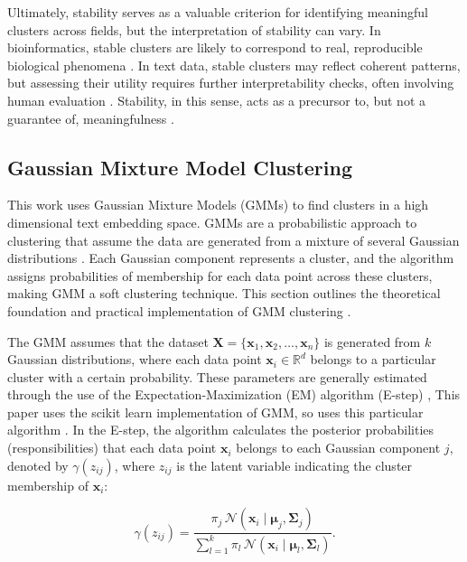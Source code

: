 Ultimately, stability serves as a valuable criterion for identifying meaningful clusters across fields, but the interpretation of stability can vary. In bioinformatics, stable clusters are likely to correspond to real, reproducible biological phenomena \cite{yu2022benchmarking}. In text data, stable clusters may reflect coherent patterns, but assessing their utility requires further interpretability checks, often involving human evaluation \cite{lord2017using}. Stability, in this sense, acts as a precursor to, but not a guarantee of, meaningfulness \cite{kuncheva2006evaluation}.




\subsection*{Gaussian Mixture Model Clustering}

This work uses Gaussian Mixture Models (GMMs) to find clusters in a high dimensional text embedding space.  GMMs are a probabilistic approach to clustering that assume the data are generated from a mixture of several Gaussian distributions \cite{21GaussianMixture}. Each Gaussian component represents a cluster, and the algorithm assigns probabilities of membership for each data point across these clusters, making GMM a soft clustering technique. This section outlines the theoretical foundation and practical implementation of GMM clustering \cite{mit_ml_notes_2015, JMLR:v25:23-1245, ghosh2018emnotes}.


The GMM assumes that the dataset $\mathbf{X} = \{\mathbf{x}_1, \mathbf{x}_2, \dots, \mathbf{x}_n\}$ is generated from $k$ Gaussian distributions, where each data point $\mathbf{x}_i \in \mathbb{R}^d$ belongs to a particular cluster with a certain probability.  These parameters are generally estimated through the use of the Expectation-Maximization (EM) algorithm (E-step) \cite{hosseiniAlternativeEMGaussian2020}, This paper uses the scikit learn implementation of GMM, so uses this particular algorithm \cite{21GaussianMixture}. In the E-step, the algorithm calculates the posterior probabilities (responsibilities) that each data point $\mathbf{x}_i$ belongs to each Gaussian component $j$, denoted by $\gamma(z_{ij})$, where $z_{ij}$ is the latent variable indicating the cluster membership of $\mathbf{x}_i$:

\begin{equation}
\gamma(z_{ij}) = \frac{\pi_j \, \mathcal{N}(\mathbf{x}_i \mid \boldsymbol{\mu}_j, \boldsymbol{\Sigma}_j)}{\sum_{l=1}^{k} \pi_l \, \mathcal{N}(\mathbf{x}_i \mid \boldsymbol{\mu}_l, \boldsymbol{\Sigma}_l)}.
\label{eq:e-step}
\end{equation}

